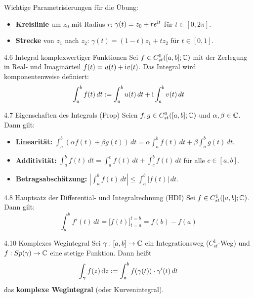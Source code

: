 \begin{tcolorbox}[colback=white, colframe=black!70, title={Bsp. 4.5 Standard-Wege}]
Wichtige Parametrisierungen für die Übung:
\begin{itemize}
    \item \textbf{Kreislinie} um $z_0$ mit Radius $r$: $\gamma(t) = z_0 + r e^{\mathrm{i} t}$ für $t \in [0, 2\pi]$.
    \item \textbf{Strecke} von $z_1$ nach $z_2$: $\gamma(t) = (1-t)z_1 + t z_2$ für $t \in [0, 1]$.
\end{itemize}
\end{tcolorbox}

\begin{defi}{4.6 Integral komplexwertiger Funktionen}
Sei $f \in C_{st}^0([a,b]; \mathbb{C})$ mit der Zerlegung in Real- und Imaginärteil $f(t) = u(t) + \mathrm{i} v(t)$. Das Integral wird komponentenweise definiert:
\[
    \int_a^b f(t) \, dt := \int_a^b u(t) \, dt + \mathrm{i} \int_a^b v(t) \, dt
\]
\end{defi}

\begin{satz}{4.7 Eigenschaften des Integrals (Prop)}
Seien $f,g \in C_{st}^0([a,b]; \mathbb{C})$ und $\alpha, \beta \in \mathbb{C}$. Dann gilt:
\begin{itemize}
    \item[i)] \textbf{Linearität:} $\int_a^b (\alpha f(t) + \beta g(t)) \, dt = \alpha \int_a^b f(t) \, dt + \beta \int_a^b g(t) \, dt$.
    \item[ii)] \textbf{Additivität:} $\int_a^b f(t) \, dt = \int_a^c f(t) \, dt + \int_c^b f(t) \, dt$ für alle $c \in [a,b]$.
    \item[iii)] \textbf{Betragsabschätzung:} $\left| \int_a^b f(t) \, dt \right| \le \int_a^b |f(t)| \, dt$.
\end{itemize}
\end{satz}

\begin{satz}{4.8 Hauptsatz der Differential- und Integralrechnung (HDI)}
Sei $f \in C_{st}^1([a,b]; \mathbb{C})$. Dann gilt:
\[
    \int_a^b f'(t) \, dt = \Big[ f(t) \Big]_{t=a}^{t=b} = f(b) - f(a)
\]
\end{satz}

\begin{defi}{4.10 Komplexes Wegintegral}
Sei $\gamma: [a,b] \to \mathbb{C}$ ein Integrationsweg ($C_{st}^1$-Weg) und $f: Sp(\gamma) \to \mathbb{C}$ eine stetige Funktion. Dann heißt
\[
    \int_\gamma f(z) \, \mathrm{d}z := \int_a^b f(\gamma(t)) \cdot \gamma'(t) \, dt
\]
das \textbf{komplexe Wegintegral} (oder Kurvenintegral).
\end{defi}

